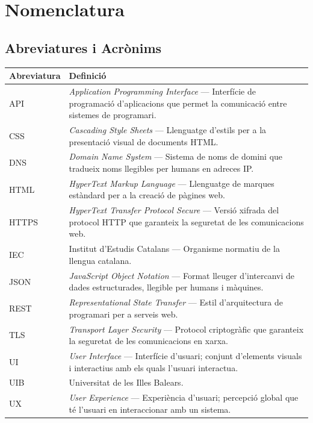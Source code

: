 \chapter*{Nomenclatura}

\section*{Abreviatures i Acrònims}

\begin{longtable}{p{3.2cm}p{10cm}}
    \toprule
    \textbf{Abreviatura} & \textbf{Definició} \\
    \midrule\endhead
    API      & \textit{Application Programming Interface} --- Interfície de programació d'aplicacions que permet la comunicació entre sistemes de programari. \\[4pt]
    CSS      & \textit{Cascading Style Sheets} --- Llenguatge d'estils per a la presentació visual de documents HTML. \\[4pt]
    DNS      & \textit{Domain Name System} --- Sistema de noms de domini que tradueix noms llegibles per humans en adreces IP. \\[4pt]
    HTML     & \textit{HyperText Markup Language} --- Llenguatge de marques estàndard per a la creació de pàgines web. \\[4pt]
    HTTPS    & \textit{HyperText Transfer Protocol Secure} --- Versió xifrada del protocol HTTP que garanteix la seguretat de les comunicacions web. \\[4pt]
    IEC      & Institut d'Estudis Catalans --- Organisme normatiu de la llengua catalana. \\[4pt]
    JSON     & \textit{JavaScript Object Notation} --- Format lleuger d'intercanvi de dades estructurades, llegible per humans i màquines. \\[4pt]
    REST     & \textit{Representational State Transfer} --- Estil d'arquitectura de programari per a serveis web. \\[4pt]
    TLS      & \textit{Transport Layer Security} --- Protocol criptogràfic que garanteix la seguretat de les comunicacions en xarxa. \\[4pt]
    UI       & \textit{User Interface} --- Interfície d'usuari; conjunt d'elements visuals i interactius amb els quals l'usuari interactua. \\[4pt]
    UIB      & Universitat de les Illes Balears. \\[4pt]
    UX       & \textit{User Experience} --- Experiència d'usuari; percepció global que té l'usuari en interaccionar amb un sistema. \\[4pt]

\end{longtable}
